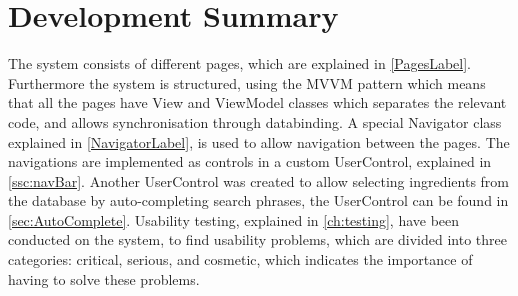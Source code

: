 \chapter{Development Summary}
The system consists of  different pages, which are explained in \cref{PagesLabel}. Furthermore the system is structured, using the MVVM pattern which means that all the pages have View and ViewModel classes which separates the relevant code, and allows synchronisation through databinding.
A special Navigator class explained in \cref{NavigatorLabel}, is used to allow navigation between the pages. The navigations are implemented as controls in a custom UserControl, explained in \cref{ssc:navBar}. Another UserControl was created to allow selecting ingredients from the database by auto-completing search phrases, the UserControl can be found in \cref{sec:AutoComplete}.
Usability testing, explained in \cref{ch:testing}, have been conducted on the system, to find usability problems, which are divided into three categories: critical, serious, and cosmetic, which indicates the importance of having to solve these problems.